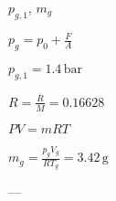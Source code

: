 \( p_{g,1} \), \( m_g \)  

\( p_g = p_0 + \frac{F}{A} \)  

\( p_{g,1} = 1.4 \, \text{bar} \)  

\( R = \frac{\bar{R}}{M} = 0.16628 \)  

\( PV = mRT \)  

\( m_g = \frac{p_g V_g}{R T_g} = 3.42 \, \text{g} \)  

---